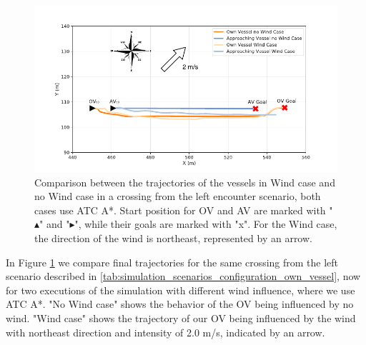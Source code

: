         \begin{figure}[H]
            \centering
            \includegraphics[width=\textwidth]{figs/Chap5/plot_ov_w_vs_wind.pdf}
            \caption{Comparison between the trajectories of the vessels in Wind case and no Wind case in a crossing from the left encounter scenario, both cases use \ac{ATC} A*. Start position for \ac{OV} and \ac{AV} are marked with "$\blacktriangle$" and "$\blacktriangleright$", while their goals are marked with "x". For the Wind case, the direction of the wind is northeast, represented by an arrow.}
            \label{fig:plot_ov_w_vs_wind}
        \end{figure}
        
        In Figure \ref{fig:plot_ov_w_vs_wind} we compare final trajectories for the same crossing from the left scenario described in \ref{tab:simulation_scenarios_configuration_own_vessel}, now for two executions of the simulation with different wind influence, where we use \ac{ATC} A*. "No Wind case" shows the behavior of the \ac{OV} being influenced by no wind. "Wind case" shows the trajectory of our \ac{OV} being influenced by the wind with northeast direction and intensity of 2.0 m/s, indicated by an arrow.
        
        
